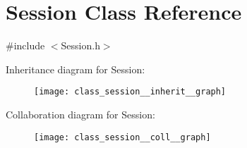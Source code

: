 \hypertarget{class_session}{}\section{Session Class Reference}
\label{class_session}


{\ttfamily \#include $<$Session.\+h$>$}



Inheritance diagram for Session\+:
\nopagebreak
\begin{figure}[H]
\begin{center}
\leavevmode
\texttt{[image: class\_session\_\_inherit\_\_graph]}
\end{center}
\end{figure}


Collaboration diagram for Session\+:
\nopagebreak
\begin{figure}[H]
\begin{center}
\leavevmode
\texttt{[image: class\_session\_\_coll\_\_graph]}
\end{center}
\end{figure}
